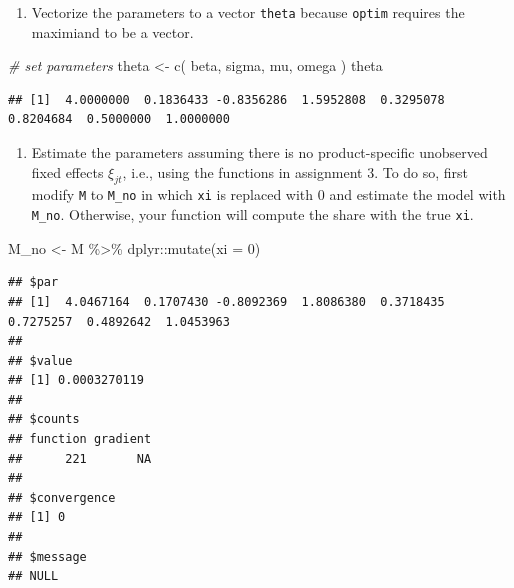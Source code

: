 \documentclass[
]{book}
\newenvironment{Shaded}{\begin{snugshade}}{\end{snugshade}}
\newcommand{\AttributeTok}[1]{\textcolor[rgb]{0.77,0.63,0.00}{#1}}
\newcommand{\CommentTok}[1]{\textcolor[rgb]{0.56,0.35,0.01}{\textit{#1}}}
\newcommand{\DecValTok}[1]{\textcolor[rgb]{0.00,0.00,0.81}{#1}}
\newcommand{\FunctionTok}[1]{\textcolor[rgb]{0.00,0.00,0.00}{#1}}
\newcommand{\NormalTok}[1]{#1}
\newcommand{\OtherTok}[1]{\textcolor[rgb]{0.56,0.35,0.01}{#1}}
\newcommand{\SpecialCharTok}[1]{\textcolor[rgb]{0.00,0.00,0.00}{#1}}
\providecommand{\tightlist}{%
  \setlength{\itemsep}{0pt}\setlength{\parskip}{0pt}}
\begin{document}
\begin{enumerate}
\def\labelenumi{\arabic{enumi}.}
\setcounter{enumi}{1}
\tightlist
\item
  Vectorize the parameters to a vector \texttt{theta} because \texttt{optim} requires the maximiand to be a vector.
\end{enumerate}

\begin{Shaded}
\begin{Highlighting}[]
\CommentTok{\# set parameters}
\NormalTok{theta }\OtherTok{\textless{}{-}} 
  \FunctionTok{c}\NormalTok{(}
\NormalTok{    beta, }
\NormalTok{    sigma, }
\NormalTok{    mu, }
\NormalTok{    omega}
\NormalTok{    )}
\NormalTok{theta}
\end{Highlighting}
\end{Shaded}

\begin{verbatim}
## [1]  4.0000000  0.1836433 -0.8356286  1.5952808  0.3295078  0.8204684  0.5000000  1.0000000
\end{verbatim}

\begin{enumerate}
\def\labelenumi{\arabic{enumi}.}
\setcounter{enumi}{2}
\tightlist
\item
  Estimate the parameters assuming there is no product-specific unobserved fixed effects \(\xi_{jt}\), i.e., using the functions in assignment 3. To do so, first modify \texttt{M} to \texttt{M\_no} in which \texttt{xi} is replaced with 0 and estimate the model with \texttt{M\_no}. Otherwise, your function will compute the share with the true \texttt{xi}.
\end{enumerate}

\begin{Shaded}
\begin{Highlighting}[]
\NormalTok{M\_no }\OtherTok{\textless{}{-}} 
\NormalTok{  M }\SpecialCharTok{\%\textgreater{}\%}
\NormalTok{  dplyr}\SpecialCharTok{::}\FunctionTok{mutate}\NormalTok{(}\AttributeTok{xi =} \DecValTok{0}\NormalTok{)}
\end{Highlighting}
\end{Shaded}

\begin{verbatim}
## $par
## [1]  4.0467164  0.1707430 -0.8092369  1.8086380  0.3718435  0.7275257  0.4892642  1.0453963
## 
## $value
## [1] 0.0003270119
## 
## $counts
## function gradient 
##      221       NA 
## 
## $convergence
## [1] 0
## 
## $message
## NULL
\end{verbatim}
\end{document}
